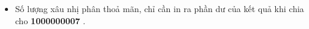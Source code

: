 \begin{itemize}
	\item Số lượng xâu nhị phân thoả mãn, chỉ cần in ra phần dư của kết quả khi chia cho \textbf{ 1000000007 } .
\end{itemize}
